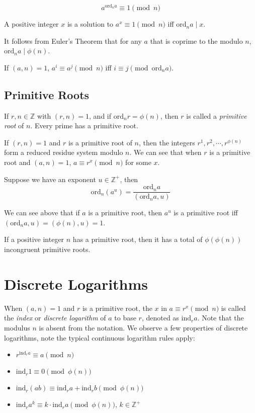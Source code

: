 \documentclass{article}
\begin{document}
\begin{multicols*}{2}
\[a^{\text{ord}_na} \equiv 1 \pmod{n}\]

A positive integer $x$ is a solution to $a^x \equiv 1 \pmod{n}$ iff $\text{ord}_na \mid x$.

It follows from Euler's Theorem that for any $a$ that is coprime to the modulo $n$, $\text{ord}_na \mid \phi(n)$.

If $(a,n) = 1$, $a^i \equiv a^j \pmod{n}$ iff $i \equiv j \pmod{\text{ord}_na}$.

\subsection*{Primitive Roots}

If $r,n \in \mathbb{Z}$ with $(r,n) = 1$, and if $\text{ord}_nr = \phi(n)$, then $r$ is called a \textit{primitive root} of $n$. Every prime has a primitive root.

If $(r,n) = 1$ and $r$ is a primitive root of $n$, then the integers $r^1,r^2,\cdots,r^{\phi(n)}$ form a reduced residue system modulo $n$. We can see that when $r$ is a primitive root and $(a,n) = 1$, $a \equiv r^x \pmod{n}$ for some $x$.

Suppose we have an exponent $u \in \mathbb{Z}^+$, then \[\text{ord}_n(a^u) = \frac{\text{ord}_na}{(\text{ord}_na, u)}\]

We can see above that if $a$ is a primitive root, then $a^u$ is a primitive root iff $(\text{ord}_na, u) = (\phi(n),u) = 1$.

If a positive integer $n$ has a primitive root, then it has a total of $\phi(\phi(n))$ incongruent primitive roots.

\section{Discrete Logarithms}

When $(a,n) = 1$ and $r$ is a primitive root, the $x$ in $a \equiv r^x \pmod{n}$ is called the \textit{index} or \textit{discrete logarithm} of $a$ to base $r$, denoted as $\text{ind}_ra$. Note that the modulus $n$ is absent from the notation. We observe a few properties of discrete logarithms, note the typical continuous logarithm rules apply:

\begin{itemize}
\item $r^{\text{ind}_ra}\equiv a \pmod{n}$
\item $\text{ind}_r1 \equiv 0 \pmod{\phi(n)}$
\item $\text{ind}_r(ab) \equiv \text{ind}_ra + \text{ind}_rb \pmod{\phi(n)}$
\item $\text{ind}_ra^k \equiv k \cdot \text{ind}_ra \pmod{\phi(n)}$, $k \in \mathbb{Z}^+$
\end{itemize}


\end{multicols*}
\end{document}
